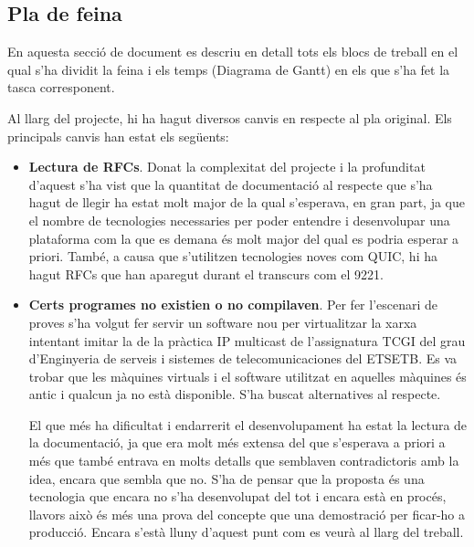 \subsection{Pla de feina}
{
    En aquesta secció de document es descriu en detall tots els blocs de treball en el qual s'ha dividit la feina i els temps (Diagrama de Gantt)
    en els que s'ha fet la tasca corresponent.
    
    Al llarg del projecte, hi ha hagut diversos canvis en respecte al pla original. Els principals canvis han estat els següents:
    \begin{itemize}
        \item \textbf{Lectura de \ac{RFC}s}. Donat la complexitat del projecte i la profunditat d'aquest s'ha vist que la quantitat de documentació
        al respecte que s'ha hagut de llegir ha estat molt major de la qual s'esperava, en gran part, ja que el nombre de tecnologies
        necessaries per poder entendre i desenvolupar una plataforma com la que es demana és molt major del qual es podria esperar a priori.
        També, a causa que s'utilitzen tecnologies noves com QUIC, hi ha hagut \ac{RFC}s que han aparegut durant el transcurs com el 9221.
        \item \textbf{Certs programes no existien o no compilaven}. Per fer l'escenari de proves s'ha volgut fer servir un software nou per virtualitzar
        la xarxa intentant imitar la de la pràctica \ac{IP} multicast de l'assignatura \ac{TCGI} del grau d'Enginyeria de serveis i sistemes
        de telecomunicaciones del \ac{ETSETB}. Es va trobar que les màquines virtuals i el software utilitzat en aquelles màquines és antic i qualcun
        ja no està disponible. S'ha buscat alternatives al respecte.
        
        El que més ha dificultat i endarrerit el desenvolupament ha estat la lectura de la documentació, ja que era molt més extensa del que s'esperava a priori
        a més que també entrava en molts detalls que semblaven contradictoris amb la idea, encara que sembla que no. S'ha de pensar que la proposta és una
        tecnologia que encara no s'ha desenvolupat del tot i encara està en procés, llavors això és més una prova del concepte que una demostració per ficar-ho
        a producció. Encara s'està lluny d'aquest punt com es veurà al llarg del treball.
    \end{itemize}
}
